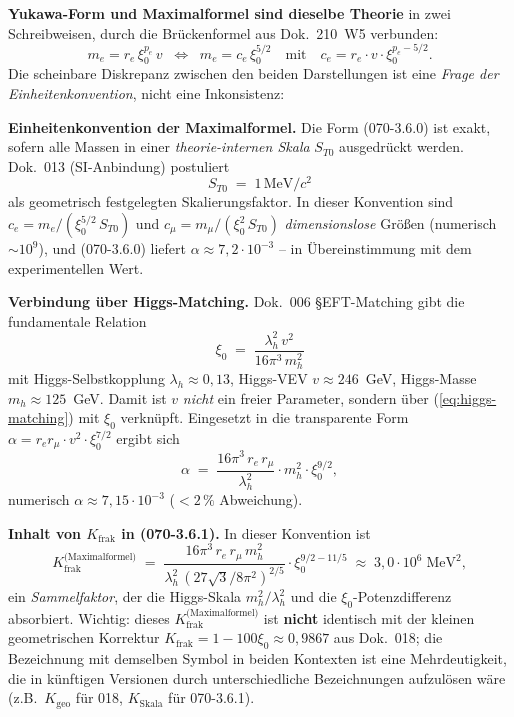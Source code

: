 \textbf{Yukawa-Form und Maximalformel sind dieselbe Theorie} in zwei
Schreibweisen, durch die Brückenformel aus Dok.~210~W5 verbunden:
\[
  m_e = r_e\,\xi_0^{p_e}\,v
  \;\;\Longleftrightarrow\;\;
  m_e = c_e\,\xi_0^{5/2}
  \quad\text{mit}\quad
  c_e = r_e \cdot v \cdot \xi_0^{p_e - 5/2}.
\]
Die scheinbare Diskrepanz zwischen den beiden Darstellungen ist eine
\emph{Frage der Einheitenkonvention}, nicht eine Inkonsistenz:

\textbf{Einheitenkonvention der Maximalformel.}
Die Form (070-3.6.0) ist exakt, sofern alle Massen in einer
\emph{theorie-internen Skala} $S_{T0}$ ausgedrückt werden. Dok.~013
(SI-Anbindung) postuliert
\begin{equation}
  S_{T0} \;=\; 1\,\text{MeV}/c^2
\end{equation}
als geometrisch festgelegten Skalierungsfaktor. In dieser Konvention
sind $c_e = m_e/(\xi_0^{5/2}\,S_{T0})$ und
$c_\mu = m_\mu/(\xi_0^{2}\,S_{T0})$ \emph{dimensionslose} Größen
(numerisch $\sim 10^9$), und (070-3.6.0) liefert
$\alpha \approx 7{,}2\cdot 10^{-3}$ -- in Übereinstimmung mit dem
experimentellen Wert.

\textbf{Verbindung über Higgs-Matching.}
Dok.~006 §EFT-Matching gibt die fundamentale Relation
\begin{equation}
  \xi_0 \;=\; \frac{\lambda_h^2\, v^2}{16\pi^3\, m_h^2}
  \label{eq:higgs-matching}
\end{equation}
mit Higgs-Selbstkopplung $\lambda_h \approx 0{,}13$, Higgs-VEV
$v \approx 246$~GeV, Higgs-Masse $m_h \approx 125$~GeV. Damit ist $v$
\emph{nicht} ein freier Parameter, sondern über (\ref{eq:higgs-matching})
mit $\xi_0$ verknüpft. Eingesetzt in die transparente Form
$\alpha = r_e r_\mu \cdot v^2 \cdot \xi_0^{7/2}$ ergibt sich
\begin{equation}
  \alpha \;=\;
  \frac{16\pi^3\,r_e\,r_\mu}{\lambda_h^2}
  \cdot m_h^2 \cdot \xi_0^{9/2},
\end{equation}
numerisch $\alpha \approx 7{,}15\cdot 10^{-3}$ ($<2\,\%$ Abweichung).

\textbf{Inhalt von $K_{\text{frak}}$ in (070-3.6.1).}
In dieser Konvention ist
\begin{equation}
  K_{\text{frak}}^{\text{(Maximalformel)}}
  \;=\;
  \frac{16\pi^3\,r_e\,r_\mu\,m_h^2}{\lambda_h^2\,(27\sqrt{3}/8\pi^2)^{2/5}}
  \cdot \xi_0^{9/2 - 11/5}
  \;\approx\; 3{,}0 \cdot 10^{6}\;\text{MeV}^2,
\end{equation}
ein \emph{Sammelfaktor}, der die Higgs-Skala $m_h^2/\lambda_h^2$ und
die $\xi_0$-Potenzdifferenz absorbiert. Wichtig: dieses
$K_{\text{frak}}^{\text{(Maximalformel)}}$ ist \textbf{nicht} identisch
mit der kleinen geometrischen Korrektur
$K_{\text{frak}} = 1 - 100\xi_0 \approx 0{,}9867$ aus Dok.~018; die
Bezeichnung mit demselben Symbol in beiden Kontexten ist eine
Mehrdeutigkeit, die in künftigen Versionen durch unterschiedliche
Bezeichnungen aufzulösen wäre (z.B.\ $K_{\text{geo}}$ für 018,
$K_{\text{Skala}}$ für 070-3.6.1).

